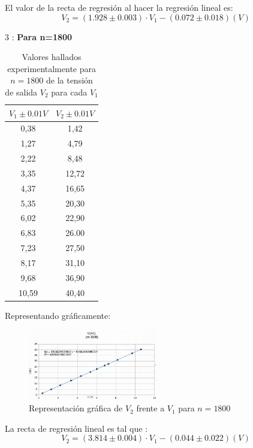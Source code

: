\documentclass[11pt,letterpaper,twocolumn]{article}
\begin{document}
El valor de la recta de regresión al hacer la regresión lineal es:
\begin{equation}
\boxed{V_2={\left( 1.928 \pm 0.003 \right) \cdot V_1 -\left( 0.072 \pm 0.018 \right)} \left( V \right) }
\end{equation}
\newpage

\item[3]: \textbf{Para n=1800}
		\begin{table}[H]
			\centering
			\caption{Valores hallados experimentalmente para $n=1800$ de la tensión de salida $V_2$ para cada $V_1$}
			\begin{tabular}{|c|c|}
				\hline
				\multicolumn{1}{|l|}{$V_1 \pm 0.01 V$} & \multicolumn{1}{l|}{$V_2 \pm 0.01 V$} \\ \hline
				0,38 & 1,42 \\ 
				1,27 & 4,79 \\
				2,22 & 8,48 \\
				3,35 & 12,72 \\
				4,37 & 16,65 \\
				5,35 & 20,30 \\ 
				6,02 & 22,90 \\ 
				6,83 & 26.00 \\ 
				7,23 & 27,50 \\
				8,17 & 31,10 \\
				9,68 & 36,90 \\
				10,59 & 40,40 \\ \hline
			\end{tabular}
			\label{}
		\end{table}
		Representando gráficamente:
		\begin{figure}[H]
			\centering
			\includegraphics[width=0.5\textwidth]{v1800.png}
			\caption{Representación gráfica de $V_2$ frente a $V_1$ para $n=1800$}
			\label{fig:1800-png}
		\end{figure}

		La recta de regresión lineal es tal que :
		\begin{equation}
			\boxed{V_2={\left( 3.814 \pm 0.004 \right) \cdot V_1 -\left( 0.044\pm 0.022 \right) } \left( V \right) }
		\end{equation}
\end{document}
